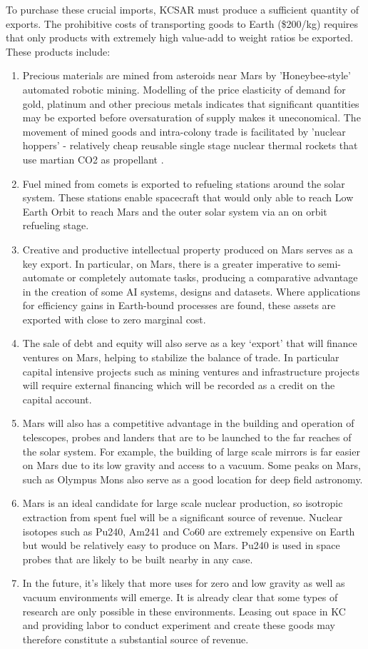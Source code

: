 \documentclass[fleqn,10pt]{Stylesheet} %
\begin{document}
To purchase these crucial imports, KCSAR must produce a sufficient quantity of exports. The prohibitive costs of transporting goods to Earth (\$200/kg) requires that only products with extremely high value-add to weight ratios be exported. These products include:

\begin{enumerate}
\item Precious materials are mined from asteroids near Mars by 'Honeybee-style' automated robotic mining. Modelling of the price elasticity of demand for gold, platinum and other precious metals indicates that significant quantities may be exported before oversaturation of supply makes it uneconomical. The movement of mined goods and intra-colony trade is facilitated by 'nuclear hoppers' - relatively cheap reusable single stage nuclear thermal rockets that use martian CO2 as propellant \cite{Zubrin2011}.
\item Fuel mined from comets is exported to refueling stations around the solar system. These stations enable spacecraft that would only able to reach Low Earth Orbit to reach Mars and the outer solar system via an on orbit refueling stage.
\item Creative and productive intellectual property produced on Mars serves as a key export. In particular, on Mars, there is a greater imperative to semi-automate or completely automate tasks, producing a comparative advantage in the creation of some AI systems, designs and datasets. Where applications for efficiency gains in Earth-bound processes are found, these assets are exported with close to zero marginal cost.
\item  The sale of debt and equity will also serve as a key ‘export’ that will finance ventures on Mars, helping to stabilize the balance of trade. In particular capital intensive projects such as mining ventures and infrastructure projects will require external financing which will be recorded as a credit on the capital account.
\item Mars will also has a competitive advantage in the building and operation of telescopes, probes and landers that are to be launched to the far reaches of the solar system. For example, the building of large scale mirrors is far easier on Mars due to its low gravity and access to a vacuum. Some peaks on Mars, such as Olympus Mons also serve as a good location for deep field astronomy.
\item Mars is an ideal candidate for large scale nuclear production, so isotropic extraction from spent fuel will be a significant source of revenue. Nuclear isotopes such as Pu240, Am241 and Co60 are extremely expensive on Earth but would be relatively easy to produce on Mars. Pu240 is used in space probes that are likely to be built nearby in any case.
\item In the future, it’s likely that more uses for zero and low gravity as well as vacuum environments will emerge. It is already clear that some types of research are only possible in these environments. Leasing out space in KC and providing labor to conduct experiment and create these goods may therefore constitute a substantial source of revenue. 
\end{enumerate}
\end{document}
